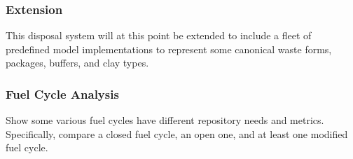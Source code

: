 \subsubsection{Extension}

This disposal system will at this point be extended to include a fleet of 
predefined model implementations to represent some canonical waste forms, 
packages, buffers, and clay types.  

\subsubsection{Fuel Cycle Analysis}

Show some various fuel cycles have different repository needs and metrics. 
Specifically, compare a closed fuel cycle, an open one, and at least one 
modified fuel cycle. 





